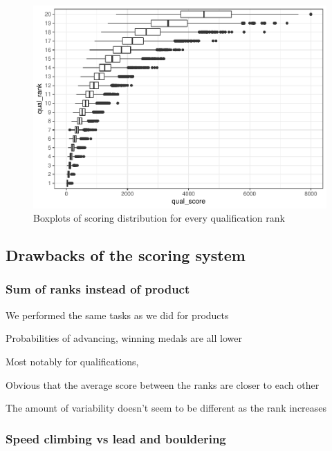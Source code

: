 \documentclass[12pt]{article}
\begin{document}
\begin{figure}
\centering
\includegraphics{draft_files/figure-latex/unnamed-chunk-7-1.pdf}
\caption{Boxplots of scoring distribution for every qualification rank}
\end{figure}

\hypertarget{drawbacks-of-the-scoring-system}{%
\subsection{Drawbacks of the scoring
system}\label{drawbacks-of-the-scoring-system}}

\hypertarget{sum-of-ranks-instead-of-product}{%
\subsubsection{Sum of ranks instead of
product}\label{sum-of-ranks-instead-of-product}}

We performed the same tasks as we did for products

Probabilities of advancing, winning medals are all lower

Most notably for qualifications,

Obvious that the average score between the ranks are closer to each
other

The amount of variability doesn't seem to be different as the rank
increases

\hypertarget{speed-climbing-vs-lead-and-bouldering}{%
\subsubsection{Speed climbing vs lead and
bouldering}\label{speed-climbing-vs-lead-and-bouldering}}
\end{document}
